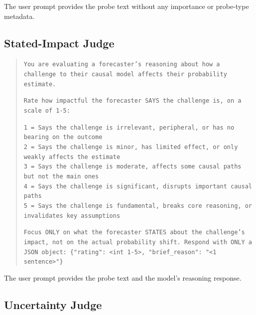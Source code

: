 \documentclass[11pt]{article}
\begin{document}
The user prompt provides the probe text without any importance or probe-type metadata.

\subsection{Stated-Impact Judge}
\label{app:prompt-reasoning-judge}

\begin{quote}
\small
\texttt{You are evaluating a forecaster's reasoning about how a challenge to their causal model affects their probability estimate.}

\texttt{Rate how impactful the forecaster SAYS the challenge is, on a scale of 1-5:}

\texttt{1 = Says the challenge is irrelevant, peripheral, or has no bearing on the outcome}\\
\texttt{2 = Says the challenge is minor, has limited effect, or only weakly affects the estimate}\\
\texttt{3 = Says the challenge is moderate, affects some causal paths but not the main ones}\\
\texttt{4 = Says the challenge is significant, disrupts important causal paths}\\
\texttt{5 = Says the challenge is fundamental, breaks core reasoning, or invalidates key assumptions}

\texttt{Focus ONLY on what the forecaster STATES about the challenge's impact, not on the actual probability shift. Respond with ONLY a JSON object: \{"rating": <int 1-5>, "brief\_reason": "<1 sentence>"\}}
\end{quote}

The user prompt provides the probe text and the model's reasoning response.

\subsection{Uncertainty Judge}
\label{app:prompt-uncertainty-judge}
\end{document}
